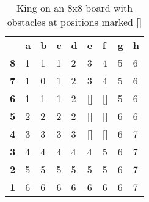 \documentclass{article}
\begin{document}
\begin{table}[H]
\centering
\caption{King on an 8x8 board with obstacles at positions marked {[}{]}}
\label{my-label}
\begin{tabular}{lllllllll}
                                & \textbf{a} & \textbf{b} & \textbf{c} & \textbf{d} & \textbf{e} & \textbf{f} & \textbf{g} & \textbf{h} \\ \cline{2-9} 
\multicolumn{1}{l|}{\textbf{8}} & 1          & 1          & 1          & 2          & 3          & 4          & 5          & 6          \\
\multicolumn{1}{l|}{\textbf{7}} & 1          & 0          & 1          & 2          & 3          & 4          & 5          & 6          \\
\multicolumn{1}{l|}{\textbf{6}} & 1          & 1          & 1          & 2          & {[}{]}          & {[}{]}          & 5          & 6          \\
\multicolumn{1}{l|}{\textbf{5}} & 2          & 2          & 2          & 2          & {[}{]}          & {[}{]}          & 6          & 6          \\
\multicolumn{1}{l|}{\textbf{4}} & 3          & 3          & 3          & 3          & {[}{]}          & {[}{]}          & 6          & 7          \\
\multicolumn{1}{l|}{\textbf{3}} & 4          & 4          & 4          & 4          & 4          & 5          & 6          & 7          \\
\multicolumn{1}{l|}{\textbf{2}} & 5          & 5          & 5          & 5          & 5          & 5          & 6          & 7          \\
\multicolumn{1}{l|}{\textbf{1}} & 6          & 6          & 6          & 6          & 6          & 6          & 6          & 7         
\end{tabular}
\end{table}
\end{document}
